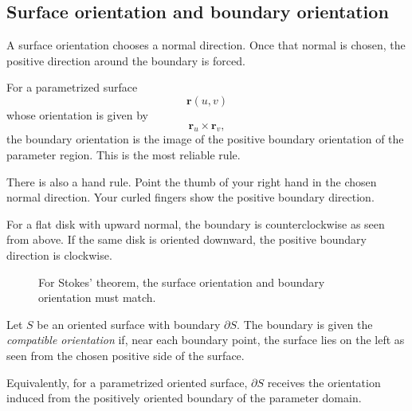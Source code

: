 \subsection{Surface orientation and boundary orientation}

A surface orientation chooses a normal direction.  Once that normal is chosen, the
positive direction around the boundary is forced.

For a parametrized surface
\[
    \mathbf r(u,v)
\]
whose orientation is given by
\[
    \mathbf r_u\times\mathbf r_v,
\]
the boundary orientation is the image of the positive boundary orientation of the
parameter region.  This is the most reliable rule.

There is also a hand rule.  Point the thumb of your right hand in the chosen normal
direction.  Your curled fingers show the positive boundary direction.

For a flat disk with upward normal, the boundary is counterclockwise as seen from
above.  If the same disk is oriented downward, the positive boundary direction is
clockwise.

\begin{figure}[h]
\centering
{}
\caption{For Stokes' theorem, the surface orientation and boundary orientation must
match.}
\end{figure}

\begin{definition}
Let \(S\) be an oriented surface with boundary \(\partial S\).  The boundary is given
the \emph{compatible orientation} if, near each boundary point, the surface lies on the
left as seen from the chosen positive side of the surface.

Equivalently, for a parametrized oriented surface, \(\partial S\) receives the orientation
induced from the positively oriented boundary of the parameter domain.
\end{definition}


